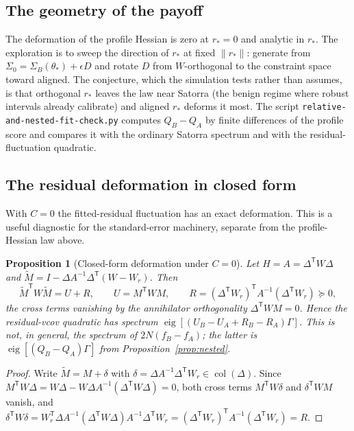 \documentclass[11pt]{article}
\newcommand{\T}{^{\mathsf{T}}}
\newcommand{\Wr}{W_{\!r}}
\newcommand{\rs}{r_{*}}
\theoremstyle{plain}
\newtheorem{proposition}{Proposition}
\theoremstyle{remark}
\begin{document}
\subsection{The geometry of the payoff}
The deformation of the profile Hessian is zero at $\rs=0$ and analytic in
$\rs$. The exploration is to sweep the direction of $\rs$ at fixed
$\lVert\rs\rVert$: generate from $\Sigma_{0}=\Sigma_{B}(\theta_{*})+\epsilon D$
and rotate $D$ from $W$-orthogonal to the constraint space toward aligned. The
conjecture, which the simulation tests rather than assumes, is that orthogonal
$\rs$ leaves the law near Satorra (the benign regime where robust intervals
already calibrate) and aligned $\rs$ deforms it most. The script
\texttt{relative-and-nested-fit-check.py} computes $Q_{B}-Q_{A}$ by finite
differences of the profile score and compares it with the ordinary Satorra
spectrum and with the residual-fluctuation quadratic.

\subsection{The residual deformation in closed form}
\label{sec:closedform}
With $C=0$ the fitted-residual fluctuation has an exact deformation. This is a
useful diagnostic for the standard-error machinery, separate from the
profile-Hessian law above.

\begin{proposition}[Closed-form deformation under $C=0$]
\label{prop:closed}
Let $H=A=\Delta\T W\Delta$ and $\widetilde M=I-\Delta A^{-1}\Delta\T(W-\Wr)$.
Then
\[
  \widetilde M\T W\widetilde M = U + R,\qquad
  U = M\T W M,\qquad
  R = (\Delta\T\Wr)\T A^{-1}(\Delta\T\Wr)\succeq 0,
\]
the cross terms vanishing by the annihilator orthogonality $\Delta\T W M=0$.
Hence the residual-vcov quadratic has spectrum
$\operatorname{eig}[(U_{B}-U_{A}+R_{B}-R_{A})\Gamma]$. This is not, in general,
the spectrum of $2N(f_{B}-f_{A})$; the latter is
$\operatorname{eig}[(Q_{B}-Q_{A})\Gamma]$ from Proposition~\ref{prop:nested}.
\end{proposition}

\begin{proof}
Write $\widetilde M=M+\delta$ with $\delta=\Delta A^{-1}\Delta\T\Wr\in\operatorname
{col}(\Delta)$. Since $M\T W\Delta=W\Delta-W\Delta A^{-1}(\Delta\T W\Delta)=0$,
both cross terms $M\T W\delta$ and $\delta\T WM$ vanish, and $\delta\T W\delta=
\Wr\T\Delta A^{-1}(\Delta\T W\Delta)A^{-1}\Delta\T\Wr=(\Delta\T\Wr)\T A^{-1}
(\Delta\T\Wr)=R$.
\end{proof}
\end{document}
